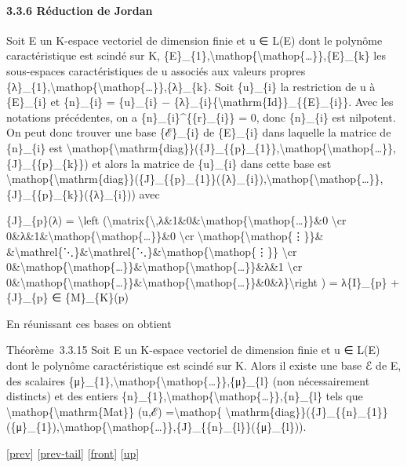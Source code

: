 \documentclass[]{article}
\begin{document}
\paragraph{3.3.6 Réduction de Jordan}

Soit E un K-espace vectoriel de dimension finie et u ∈ L(E) dont le
polynôme caractéristique est scindé sur K,
\{E\}\_\{1\},\textbackslash{}mathop\{\textbackslash{}mathop\{\ldots{}\}\},\{E\}\_\{k\}
les sous-espaces caractéristiques de u associés aux valeurs propres
\{λ\}\_\{1\},\textbackslash{}mathop\{\textbackslash{}mathop\{\ldots{}\}\},\{λ\}\_\{k\}.
Soit \{u\}\_\{i\} la restriction de u à \{E\}\_\{i\} et \{n\}\_\{i\} =
\{u\}\_\{i\} −
\{λ\}\_\{i\}\{\textbackslash{}mathrm\{Id\}\}\_\{\{E\}\_\{i\}\}. Avec les
notations précédentes, on a \{n\}\_\{i\}\^{}\{\{r\}\_\{i\}\} = 0, donc
\{n\}\_\{i\} est nilpotent. On peut donc trouver une base \{ℰ\}\_\{i\}
de \{E\}\_\{i\} dans laquelle la matrice de \{n\}\_\{i\} est
\textbackslash{}mathop\{\textbackslash{}mathrm\{diag\}\}(\{J\}\_\{\{p\}\_\{1\}\},\textbackslash{}mathop\{\textbackslash{}mathop\{\ldots{}\}\},\{J\}\_\{\{p\}\_\{k\}\})
et alors la matrice de \{u\}\_\{i\} dans cette base est
\textbackslash{}mathop\{\textbackslash{}mathrm\{diag\}\}(\{J\}\_\{\{p\}\_\{1\}\}(\{λ\}\_\{i\}),\textbackslash{}mathop\{\textbackslash{}mathop\{\ldots{}\}\},\{J\}\_\{\{p\}\_\{k\}\}(\{λ\}\_\{i\}))
avec

\{J\}\_\{p\}(λ) = \textbackslash{}left
(\textbackslash{}matrix\{\textbackslash{},λ\&1\&0\&\textbackslash{}mathop\{\textbackslash{}mathop\{\ldots{}\}\}\&0
\textbackslash{}cr
0\&λ\&1\&\textbackslash{}mathop\{\textbackslash{}mathop\{\ldots{}\}\}\&0
\textbackslash{}cr
\textbackslash{}mathop\{\textbackslash{}mathop\{⋮\}\}\&
\&\textbackslash{}mathrel\{⋱\}\&\textbackslash{}mathrel\{⋱\}\&\textbackslash{}mathop\{\textbackslash{}mathop\{⋮\}\}
\textbackslash{}cr
0\&\textbackslash{}mathop\{\textbackslash{}mathop\{\ldots{}\}\}\&\textbackslash{}mathop\{\textbackslash{}mathop\{\ldots{}\}\}\&λ\&1
\textbackslash{}cr
0\&\textbackslash{}mathop\{\textbackslash{}mathop\{\ldots{}\}\}\&\textbackslash{}mathop\{\textbackslash{}mathop\{\ldots{}\}\}\&0\&λ\}\textbackslash{}right
) = λ\{I\}\_\{p\} + \{J\}\_\{p\} ∈ \{M\}\_\{K\}(p)

En réunissant ces bases on obtient

Théorème~3.3.15 Soit E un K-espace vectoriel de dimension finie et u ∈
L(E) dont le polynôme caractéristique est scindé sur K. Alors il existe
une base ℰ de E, des scalaires
\{μ\}\_\{1\},\textbackslash{}mathop\{\textbackslash{}mathop\{\ldots{}\}\},\{μ\}\_\{l\}
(non nécessairement distincts) et des entiers
\{n\}\_\{1\},\textbackslash{}mathop\{\textbackslash{}mathop\{\ldots{}\}\},\{n\}\_\{l\}
tels que \textbackslash{}mathop\{\textbackslash{}mathrm\{Mat\}\} (u,ℰ)
=\textbackslash{}mathop\{
\textbackslash{}mathrm\{diag\}\}(\{J\}\_\{\{n\}\_\{1\}\}(\{μ\}\_\{1\}),\textbackslash{}mathop\{\textbackslash{}mathop\{\ldots{}\}\},\{J\}\_\{\{n\}\_\{l\}\}(\{μ\}\_\{l\})).

{[}\href{coursse16.html}{prev}{]}
{[}\href{coursse16.html\#tailcoursse16.html}{prev-tail}{]}
{[}\href{coursse17.html}{front}{]}
{[}\href{coursch4.html\#coursse17.html}{up}{]}
\end{document}
